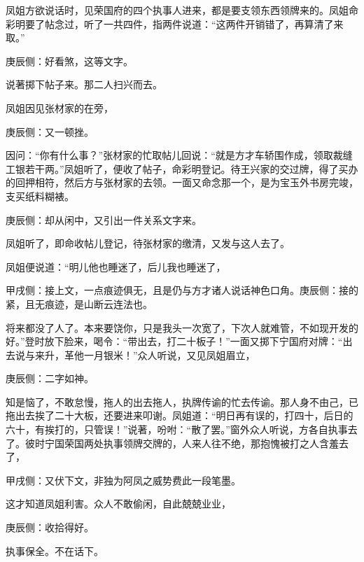 \begin{parag}
    凤姐方欲说话时，见荣国府的四个执事人进来，都是要支领东西领牌来的。凤姐命彩明要了帖念过，听了一共四件，指两件说道：“这两件开销错了，再算清了来取。”\begin{note}庚辰侧：好看煞，这等文字。\end{note}说著掷下帖子来。那二人扫兴而去。
\end{parag}


\begin{parag}
    凤姐因见张材家的在旁，\begin{note}庚辰侧：又一顿挫。\end{note}因问：“你有什么事？”张材家的忙取帖儿回说：“就是方才车轿围作成，领取裁缝工银若干两。”凤姐听了，便收了帖子，命彩明登记。待王兴家的交过牌，得了买办的回押相符，然后方与张材家的去领。一面又命念那一个，是为宝玉外书房完竣，支买纸料糊裱。\begin{note}庚辰侧：却从闲中，又引出一件关系文字来。\end{note}凤姐听了，即命收帖儿登记，待张材家的缴清，又发与这人去了。
\end{parag}


\begin{parag}
    凤姐便说道：“明儿他也睡迷了，后儿我也睡迷了，\begin{note}甲戌侧：接上文，一点痕迹俱无，且是仍与方才诸人说话神色口角。庚辰侧：接的紧，且无痕迹，是山断云连法也。\end{note}将来都没了人了。本来要饶你，只是我头一次宽了，下次人就难管，不如现开发的好。”登时放下脸来，喝令：“带出去，打二十板子！”一面又掷下宁国府对牌：“出去说与来升，革他一月银米！”众人听说，又见凤姐眉立，\begin{note}庚辰侧：二字如神。\end{note}知是恼了，不敢怠慢，拖人的出去拖人，执牌传谕的忙去传谕。那人身不由己，已拖出去挨了二十大板，还要进来叩谢。凤姐道：“明日再有误的，打四十，后日的六十，有挨打的，只管误！”说著，吩咐：“散了罢。”窗外众人听说，方各自执事去了。彼时宁国荣国两处执事领牌交牌的，人来人往不绝，那抱愧被打之人含羞去了，\begin{note}甲戌侧：又伏下文，非独为阿凤之威势费此一段笔墨。\end{note}这才知道凤姐利害。众人不敢偷闲，自此兢兢业业，\begin{note}庚辰侧：收拾得好。\end{note}执事保全。不在话下。
\end{parag}


